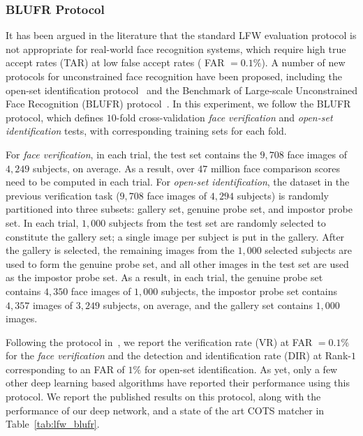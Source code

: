 \documentclass[10pt,journal,compsoc]{IEEEtran}
\begin{document}
\subsubsection{BLUFR Protocol}
It has been argued in the literature that the standard LFW evaluation protocol is not appropriate for real-world face recognition systems, which require high true accept rates (TAR) at low false accept rates ( FAR $=0.1\%$). A number of new protocols for unconstrained face recognition have been proposed, including the open-set identification protocol~\cite{faceretrieval:fusion} and the Benchmark of Large-scale Unconstrained Face Recognition (BLUFR) protocol~\cite{BLUFR}. In this experiment, we follow the BLUFR protocol, which defines $10$-fold cross-validation \emph{face verification} and \emph{open-set identification} tests, with corresponding training sets for each fold.

For \emph{face verification}, in each trial, the test set contains the $9,708$ face images of $4,249$ subjects, on average. As a result, over $47$ million face comparison scores need to be computed in each trial.  For \emph{open-set identification}, the dataset in the previous verification task ($9,708$ face images of $4,294$ subjects) is randomly partitioned into three subsets: gallery set, genuine probe set, and impostor probe set. In each trial, $1,000$ subjects from the test set are randomly selected to constitute the gallery set; a single image per subject is put in the gallery. After the gallery is selected, the remaining images from the $1,000$ selected subjects are used to form the genuine probe set, and all other images in the test set are used as the impostor probe set. As a result, in each trial, the genuine probe set contains $4,350$ face images of $1,000$ subjects, the impostor probe set contains $4,357$ images of $3,249$ subjects, on average, and the gallery set contains $1,000$ images.

Following the protocol in~\cite{BLUFR}, we report the verification rate (VR) at FAR $=0.1\%$ for the \emph{face verification} and the detection and identification rate (DIR) at Rank-$1$ corresponding to an FAR of $1\%$ for {open-set identification}. As yet, only a few other deep learning based algorithms have reported their performance using this protocol. We report the published results on this protocol, along with the performance of our deep network, and a state of the art COTS matcher in Table~\ref{tab:lfw_blufr}.
\end{document}
